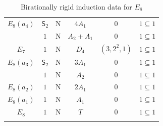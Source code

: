 \documentclass[11pt]{amsart}
\newcommand{\Sym}{{\mathsf{S}}}
\numberwithin{equation}{section}
\begin{document}
\begin{center}
\begin{longtable}{|c|c|c|c|c|c|}
			\hline
			$E_8(a_4)$ & $\Sym_2$ & N & $4 A_1$ & $0$ & $1\subseteq 1$ \\
			& $1$ & N & $A_2 + A_1$ & $0$ & $1\subseteq 1$ \\
			\hline
			$E_7$ & $1$ & N & $D_4$ & $(3,2^2,1)$ & $1\subseteq 1$\\
			\hline
			$E_8(a_3)$ & $\Sym_2$ & N & $3 A_1$ & $0$ & $1\subseteq 1$ \\
			& $1$ & N & $A_2$ & $0$ & $1\subseteq 1$ \\
			\hline
			$E_8(a_2)$ & $1$ & N & $2 A_1$ & $0$ & $1\subseteq 1$ \\
			\hline
			$E_8(a_1)$ & $1$ & N & $A_1$ & $0$ & $1\subseteq 1$ \\
			\hline
			$E_8$ & $1$ & N & $T$ & $0$ & $1\subseteq 1$ \\
			\hline
			\caption{Birationally rigid induction data for $E_8$}\label{ta: E8}
		\end{longtable}
	\end{center}
	
\end{document}
